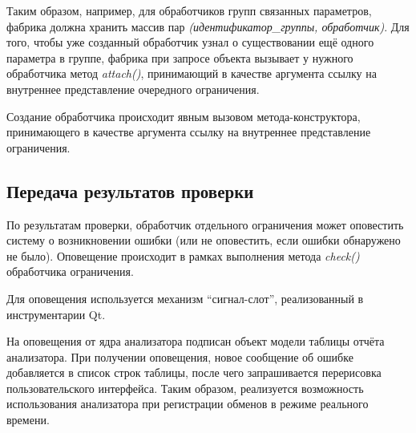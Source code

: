 Таким образом, например, для обработчиков групп связанных параметров, фабрика 
должна хранить массив пар \textit{(идентификатор\_группы, обработчик)}. Для 
того, чтобы уже созданный обработчик узнал о существовании ещё одного параметра 
в группе, фабрика при запросе объекта вызывает у нужного обработчика метод 
\textit{attach()}, принимающий в качестве аргумента ссылку на внутреннее 
представление очередного ограничения.

Создание обработчика происходит явным вызовом метода-конструктора, принимающего 
в качестве аргумента ссылку на внутреннее представление ограничения.

\subsection{Передача результатов проверки}

По результатам проверки, обработчик отдельного ограничения может оповестить 
систему о возникновении ошибки (или не оповестить, если ошибки обнаружено не 
было). Оповещение происходит в рамках выполнения метода \textit{check()} 
обработчика ограничения.

Для оповещения используется механизм ``сигнал-слот'', реализованный в 
инструментарии Qt.

На оповещения от ядра анализатора подписан объект модели таблицы отчёта 
анализатора. При получении оповещения, новое сообщение об ошибке добавляется в 
список строк таблицы, после чего запрашивается перерисовка пользовательского 
интерфейса. Таким образом, реализуется возможность использования анализатора при 
регистрации обменов в режиме реального времени.